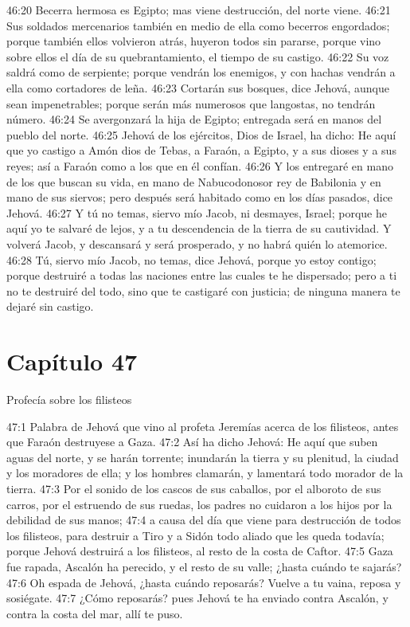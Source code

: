 46:20 Becerra hermosa es Egipto; mas viene destrucción, del norte viene. 
46:21 Sus soldados mercenarios también en medio de ella como becerros engordados; porque también ellos volvieron atrás, huyeron todos sin pararse, porque vino sobre ellos el día de su quebrantamiento, el tiempo de su castigo. 
46:22 Su voz saldrá como de serpiente; porque vendrán los enemigos, y con hachas vendrán a ella como cortadores de leña. 
46:23 Cortarán sus bosques, dice Jehová, aunque sean impenetrables; porque serán más numerosos que langostas, no tendrán número. 
46:24 Se avergonzará la hija de Egipto; entregada será en manos del pueblo del norte. 
46:25 Jehová de los ejércitos, Dios de Israel, ha dicho: He aquí que yo castigo a Amón dios de Tebas, a Faraón, a Egipto, y a sus dioses y a sus reyes; así a Faraón como a los que en él confían. 
46:26 Y los entregaré en mano de los que buscan su vida, en mano de Nabucodonosor rey de Babilonia y en mano de sus siervos; pero después será habitado como en los días pasados, dice Jehová. 
46:27 Y tú no temas, siervo mío Jacob, ni desmayes, Israel; porque he aquí yo te salvaré de lejos, y a tu descendencia de la tierra de su cautividad. Y volverá Jacob, y descansará y será prosperado, y no habrá quién lo atemorice. 
46:28 Tú, siervo mío Jacob, no temas, dice Jehová, porque yo estoy contigo; porque destruiré a todas las naciones entre las cuales te he dispersado; pero a ti no te destruiré del todo, sino que te castigaré con justicia; de ninguna manera te dejaré sin castigo.   
\section*{Capítulo 47 }
Profecía sobre los filisteos 
 
47:1 Palabra de Jehová que vino al profeta Jeremías acerca de los filisteos, antes que Faraón destruyese a Gaza. 
47:2 Así ha dicho Jehová: He aquí que suben aguas del norte, y se harán torrente; inundarán la tierra y su plenitud, la ciudad y los moradores de ella; y los hombres clamarán, y lamentará todo morador de la tierra. 
47:3 Por el sonido de los cascos de sus caballos, por el alboroto de sus carros, por el estruendo de sus ruedas, los padres no cuidaron a los hijos por la debilidad de sus manos; 
47:4 a causa del día que viene para destrucción de todos los filisteos, para destruir a Tiro y a Sidón todo aliado que les queda todavía; porque Jehová destruirá a los filisteos, al resto de la costa de Caftor. 
47:5 Gaza fue rapada, Ascalón ha perecido, y el resto de su valle; ¿hasta cuándo te sajarás? 
47:6 Oh espada de Jehová, ¿hasta cuándo reposarás? Vuelve a tu vaina, reposa y sosiégate. 
47:7 ¿Cómo reposarás? pues Jehová te ha enviado contra Ascalón, y contra la costa del mar, allí te puso. 
